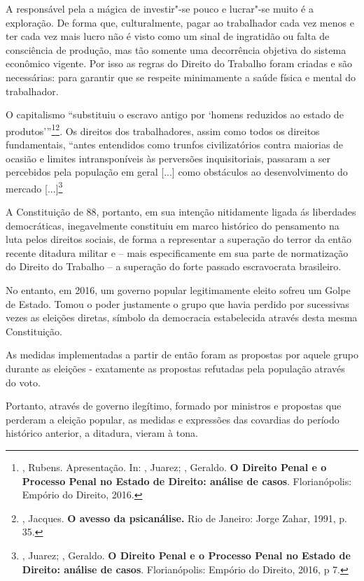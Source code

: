 A responsável pela a mágica de investir"-se pouco e lucrar"-se muito é a
exploração. De forma que, culturalmente, pagar ao trabalhador cada vez
menos e ter cada vez mais lucro não é visto como um sinal de ingratidão
ou falta de consciência de produção, mas tão somente uma decorrência
objetiva do sistema econômico vigente. Por isso as regras do Direito do
Trabalho foram criadas e são necessárias: para garantir que se respeite
minimamente a saúde física e mental do trabalhador.

O capitalismo ``substituiu o escravo antigo por `homens reduzidos ao
estado de produtos'''\footnote{, Rubens. Apresentação. In:
  , Juarez; , Geraldo. \textbf{O Direito Penal e o Processo
  Penal no Estado de Direito: análise de casos}. Florianópolis: Empório
  do Direito, 2016.}\footnote{, Jacques. \textbf{O avesso da
  psicanálise.} Rio de Janeiro: Jorge Zahar, 1991, p. 35.}. Os direitos
dos trabalhadores, assim como todos os direitos fundamentais, ``antes
entendidos como trunfos civilizatórios contra maiorias de ocasião e
limites intransponíveis às perversões inquisitoriais, passaram a ser
percebidos pela população em geral {[}...{]} como obstáculos ao
desenvolvimento do mercado {[}...{]}\footnote{, Juarez; ,
  Geraldo. \textbf{O Direito Penal e o Processo Penal no Estado de
  Direito: análise de casos}. Florianópolis: Empório do Direito, 2016, p
  7.}

A Constituição de 88, portanto, em sua intenção nitidamente ligada ás
liberdades democráticas, inegavelmente constituiu em marco histórico do
pensamento na luta pelos direitos sociais, de forma a representar a
superação do terror da então recente ditadura militar e -- mais
especificamente em sua parte de normatização do Direito do Trabalho -- a
superação do forte passado escravocrata brasileiro.

No entanto, em 2016, um governo popular legitimamente eleito sofreu um
Golpe de Estado. Tomou o poder justamente o grupo que havia perdido por
sucessivas vezes as eleições diretas, símbolo da democracia estabelecida
através desta mesma Constituição.

As medidas implementadas a partir de então foram as propostas por aquele
grupo durante as eleições - exatamente as propostas refutadas pela
população através do voto.

Portanto, através de governo ilegítimo, formado por ministros e
propostas que perderam a eleição popular, as medidas e expressões das
covardias do período histórico anterior, a ditadura, vieram à tona.

